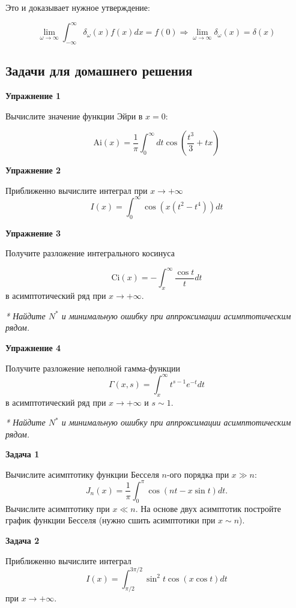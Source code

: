 \documentclass[a4paper,12pt]{article}
\begin{document}
\noindent
Это и доказывает нужное утверждение:

\[
\lim_{\omega\to\infty}\int_{-\infty}^{\infty}\delta_{\omega}(x)f(x)dx=f(0)\Rightarrow\lim_{\omega\to\infty}\delta_{\omega}(x)=\delta(x)
\]

\newpage
\subsection*{Задачи для домашнего решения}

\noindent \textbf{Упражнение 1}

\noindent Вычислите значение функции Эйри в $x=0$:

$$
\mathrm{Ai}(x)	=\frac{1}{\pi}\int_{0}^{\infty}dt\cos(\frac{t^{3}}{3}+tx)
$$

\vspace{15pt}
\noindent \textbf{Упражнение 2}

\noindent Приближенно вычислите интеграл при $x\rightarrow+\infty$
$$
I(x)	=\int_{0}^{\infty}\cos(x(t^{2}-t^{4}))dt
$$

\vspace{15pt}
\noindent \textbf{Упражнение 3}

\noindent Получите разложение интегрального косинуса

$$
\mathrm{Ci}(x)	=-\int_{x}^{\infty}\frac{\cos t}{t}dt
$$
\noindent в асимптотический ряд при $x\rightarrow+\infty$.

\noindent \textit{* Найдите $N^{*}$ и минимальную ошибку при аппроксимации асимптотическим рядом.}

\vspace{15pt}
\noindent \textbf{Упражнение 4}

\noindent Получите разложение неполной гамма-функции
$$
\Gamma(x,s)	=\int_{x}^{\infty}t^{s-1}e^{-t}dt
$$
\noindent в асимптотический ряд при $x\rightarrow+\infty$ и $s\sim 1$.

\noindent \textit{* Найдите $N^{*}$ и минимальную ошибку при аппроксимации асимптотическим рядом.}

\vspace{15pt}
\noindent \textbf{Задача 1}

\noindent Вычислите асимптотику функции Бесселя $n$-ого порядка при $x\gg n$:
$$
J_{n}(x)	=\frac{1}{\pi}\int_{0}^{\pi}\cos(nt-x\sin t)dt.
$$
\noindent Вычислите асимптотику при $x\ll n$. На основе двух асимптотик постройте график функции Бесселя (нужно сшить асимптотики при $x\sim n$).

\vspace{15pt}
\noindent \textbf{Задача 2}

\noindent Приближенно вычислите интеграл
$$
I(x)	=\int_{\pi/2}^{3\pi/2}\sin^{2}t\cos(x\cos t)dt
$$
\noindent при $x\rightarrow+\infty$.
\end{document}
